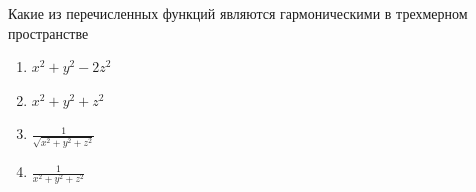 Какие из перечисленных функций являются гармоническими в трехмерном пространстве

\begin{enumerate}[label=\arabic*)]
    \item \(x^2+y^2-2z^2\)
    \item \(x^2+y^2+z^2\)
    \item \(\frac{1}{\sqrt{x^2+y^2+z^2}}\)
    \item \(\frac{1}{x^2+y^2+z^2}\)
\end{enumerate}

